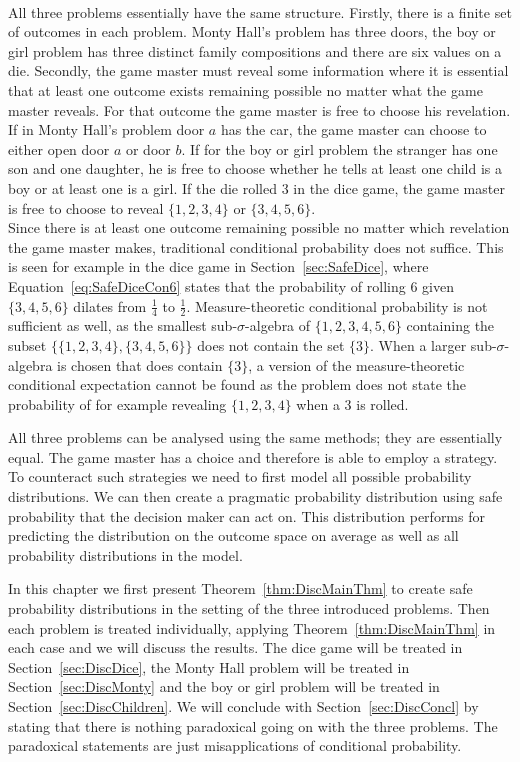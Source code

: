 \documentclass[a4paper]{report}
\theoremstyle{plain}
\theoremstyle{definition}
\theoremstyle{remark}
\numberwithin{equation}{chapter}
\DeclareMathOperator{\1}{\mathbbm{1}}
\begin{document}
\paragraph{}
All three problems essentially have the same structure. Firstly, there is a finite set of outcomes in each problem. Monty Hall's problem has three doors, the boy or girl problem has three distinct family compositions and there are six values on a die. Secondly, the game master must reveal some information where it is essential that at least one outcome exists remaining possible no matter what the game master reveals. For that outcome the game master is free to choose his revelation. If in Monty Hall's problem door $a$ has the car, the game master can choose to either open door $a$ or door $b$. If for the boy or girl problem the stranger has one son and one daughter, he is free to choose whether he tells at least one child is a boy or at least one is a girl. If the die rolled 3 in the dice game, the game master is free to choose to reveal $\{1,2,3,4\}$ or $\{3,4,5,6\}$.\\
Since there is at least one outcome remaining possible no matter which revelation the game master makes, traditional conditional probability does not suffice. This is seen for example in the dice game in Section~\ref{sec:SafeDice}, where Equation~\ref{eq:SafeDiceCon6} states that the probability of rolling $6$ given $\{3,4,5,6\}$ dilates from $\frac{1}{4}$ to $\frac{1}{2}$. Measure-theoretic conditional probability is not sufficient as well, as the smallest sub-$\sigma$-algebra of $\{1,2,3,4,5,6\}$ containing the subset $\{\{1,2,3,4\},\{3,4,5,6\}\}$ does not contain the set $\{3\}$. When a larger sub-$\sigma$-algebra is chosen that does contain $\{3\}$, a version of the measure-theoretic conditional expectation cannot be found as the problem does not state the probability of for example revealing $\{1,2,3,4\}$ when a $3$ is rolled.

All three problems can be analysed using the same methods; they are essentially equal. The game master has a choice and therefore is able to employ a strategy. To counteract such strategies we need to first model all possible probability distributions. We can then create a pragmatic probability distribution using safe probability that the decision maker can act on. This distribution performs for predicting the distribution on the outcome space on average as well as all probability distributions in the model.

In this chapter we first present Theorem~\ref{thm:DiscMainThm} to create safe probability distributions in the setting of the three introduced problems. Then each problem is treated individually, applying Theorem~\ref{thm:DiscMainThm} in each case and we will discuss the results. The dice game will be treated in Section~\ref{sec:DiscDice}, the Monty Hall problem will be treated in Section~\ref{sec:DiscMonty} and the boy or girl problem will be treated in Section~\ref{sec:DiscChildren}. We will conclude with Section~\ref{sec:DiscConcl} by stating that there is nothing paradoxical going on with the three problems. The paradoxical statements are just misapplications of conditional probability.
\end{document}
